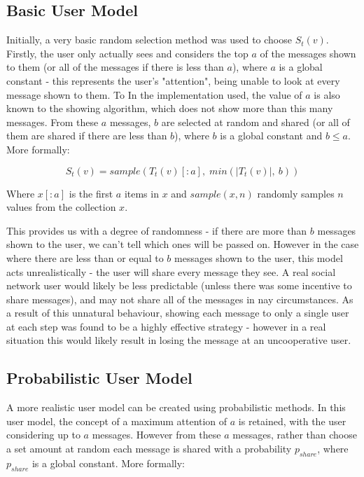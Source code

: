 \documentclass[bsc,frontabs,twoside,singlespacing,parskip,deptreport]{infthesis}     %
\begin{document}
\subsection{Basic User Model}
Initially, a very basic random selection method was used to choose $S_{t}(v)$. Firstly, the user only actually sees and considers the top $a$ of the messages shown to them (or all of the messages if there is less than $a$), where $a$ is a global constant - this represents the user's "attention", being unable to look at every message shown to them. To In the implementation used, the value of $a$ is also known to the showing algorithm, which does not show more than this many messages. From these $a$ messages, $b$ are selected at random and shared (or all of them are shared if there are less than $b$), where $b$ is a global constant and $b \le a$. More formally:

\begin{equation}
S_{t}(v) = sample(T_{t}(v)[:a], \; min(|T_{t}(v)|,\: b))
\end{equation}

Where $x[:a]$ is the first $a$ items in $x$ and $sample(x, n)$ randomly samples $n$ values from the collection $x$.

This provides us with a degree of randomness - if there are more than $b$ messages shown to the user, we can't tell which ones will be passed on. However in the case where there are less than or equal to $b$ messages shown to the user, this model acts unrealistically - the user will share every message they see. A real social network user would likely be less predictable (unless there was some incentive to share messages), and may not share all of the messages in nay circumstances. As a result of this unnatural behaviour, showing each message to only a single user at each step was found to be a highly effective strategy - however in a real situation this would likely result in losing the message at an uncooperative user.

\subsection{Probabilistic User Model}
A more realistic user model can be created using probabilistic methods. In this user model, the concept of a maximum attention of $a$ is retained, with the user considering up to $a$ messages. However from these $a$ messages, rather than choose a set amount at random each message is shared with a probability $p_{share}$, where $p_{share}$ is a global constant. More formally:
\end{document}
